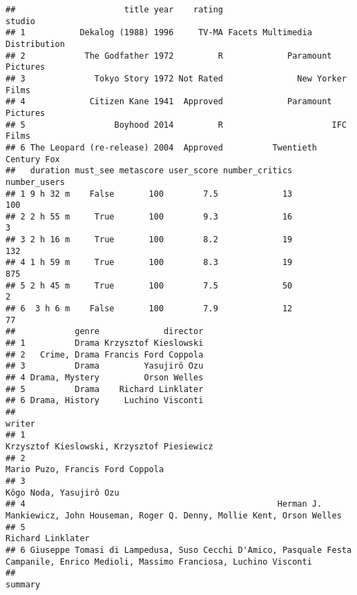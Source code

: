 \documentclass[
]{article}
\begin{document}
\begin{verbatim}
##                      title year    rating                         studio
## 1           Dekalog (1988) 1996     TV-MA Facets Multimedia Distribution
## 2            The Godfather 1972         R             Paramount Pictures
## 3              Tokyo Story 1972 Not Rated               New Yorker Films
## 4             Citizen Kane 1941  Approved             Paramount Pictures
## 5                  Boyhood 2014         R                      IFC Films
## 6 The Leopard (re-release) 2004  Approved          Twentieth Century Fox
##   duration must_see metascore user_score number_critics number_users
## 1 9 h 32 m    False       100        7.5             13          100
## 2 2 h 55 m     True       100        9.3             16            3
## 3 2 h 16 m     True       100        8.2             19          132
## 4 1 h 59 m     True       100        8.3             19          875
## 5 2 h 45 m     True       100        7.5             50            2
## 6  3 h 6 m    False       100        7.9             12           77
##            genre             director
## 1          Drama Krzysztof Kieslowski
## 2   Crime, Drama Francis Ford Coppola
## 3          Drama         Yasujirô Ozu
## 4 Drama, Mystery         Orson Welles
## 5          Drama    Richard Linklater
## 6 Drama, History     Luchino Visconti
##                                                                                                                             writer
## 1                                                                                       Krzysztof Kieslowski, Krzysztof Piesiewicz
## 2                                                                                                 Mario Puzo, Francis Ford Coppola
## 3                                                                                                          Kôgo Noda, Yasujirô Ozu
## 4                                                   Herman J. Mankiewicz, John Houseman, Roger Q. Denny, Mollie Kent, Orson Welles
## 5                                                                                                                Richard Linklater
## 6 Giuseppe Tomasi di Lampedusa, Suso Cecchi D'Amico, Pasquale Festa Campanile, Enrico Medioli, Massimo Franciosa, Luchino Visconti
##                                                                                                                                                                                                                                                                                                                                                                                                                                                                                                                                                                                                                                                                                                                                                                                                                                                                                                                                                                                                                           summary

\end{verbatim}
\end{document}
